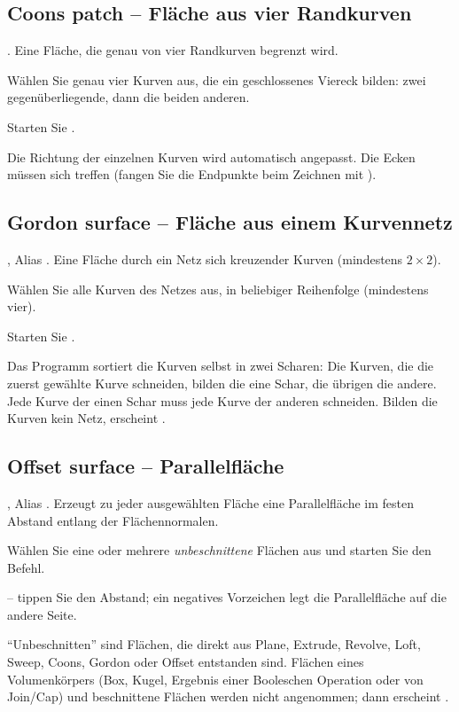 \subsection{Coons patch -- Fläche aus vier Randkurven}\label{sec:cmd-coons}
. Eine Fläche, die genau von vier Randkurven begrenzt wird.
\begin{schritte}
\item Wählen Sie genau vier Kurven aus, die ein geschlossenes Viereck bilden: zwei
  gegenüberliegende, dann die beiden anderen.
\item Starten Sie .
\end{schritte}
Die Richtung der einzelnen Kurven wird automatisch angepasst. Die Ecken müssen sich treffen
(fangen Sie die Endpunkte beim Zeichnen mit ).

\subsection{Gordon surface -- Fläche aus einem Kurvennetz}\label{sec:cmd-gordon}
, Alias . Eine Fläche durch ein Netz sich kreuzender Kurven
(mindestens $2 \times 2$).
\begin{schritte}
\item Wählen Sie alle Kurven des Netzes aus, in beliebiger Reihenfolge (mindestens vier).
\item Starten Sie .
\end{schritte}
Das Programm sortiert die Kurven selbst in zwei Scharen: Die Kurven, die die zuerst gewählte
Kurve schneiden, bilden die eine Schar, die übrigen die andere. Jede Kurve der einen Schar muss
jede Kurve der anderen schneiden. Bilden die Kurven kein Netz, erscheint
.

\subsection{Offset surface -- Parallelfläche}\label{sec:cmd-offset-surface}
, Alias . Erzeugt zu jeder ausgewählten Fläche eine
Parallelfläche im festen Abstand entlang der Flächennormalen.
\begin{schritte}
\item Wählen Sie eine oder mehrere \emph{unbeschnittene} Flächen aus und starten Sie den
  Befehl.
\item {} -- tippen Sie den
  Abstand; ein negatives Vorzeichen legt die Parallelfläche auf die andere Seite.
\end{schritte}
\begin{hinweis}
\enquote{Unbeschnitten} sind Flächen, die direkt aus Plane, Extrude, Revolve, Loft, Sweep,
Coons, Gordon oder Offset entstanden sind. Flächen eines Volumenkörpers (Box, Kugel, Ergebnis
einer Booleschen Operation oder von Join/Cap) und beschnittene Flächen werden nicht
angenommen; dann erscheint .
\end{hinweis}

